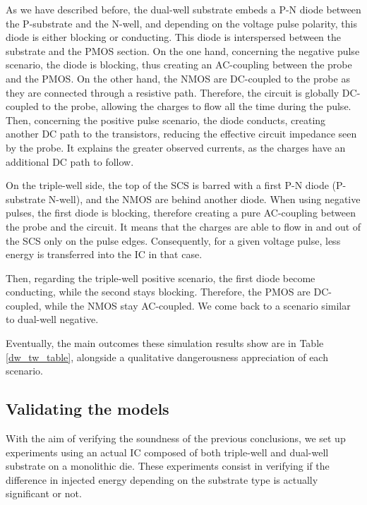 		As we have described before, the dual-well substrate embeds a P-N diode between the P-substrate and the N-well, and depending on the voltage pulse polarity, this diode is either blocking or conducting.
		This diode is interspersed between the substrate and the PMOS section.
		On the one hand, concerning the negative pulse scenario, the diode is blocking, thus creating an AC-coupling between the probe and the PMOS.
		On the other hand, the NMOS are DC-coupled to the probe as they are connected through a resistive path.
		Therefore, the circuit is globally DC-coupled to the probe, allowing the charges to flow all the time during the pulse.
		Then, concerning the positive pulse scenario, the diode conducts, creating another DC path to the transistors, reducing the effective circuit impedance seen by the probe.
		It explains the greater observed currents, as the charges have an additional DC path to follow.

		On the triple-well side, the top of the SCS is barred with a first P-N diode (P-substrate N-well), and the NMOS are behind another diode.
		When using negative pulses, the first diode is blocking, therefore creating a pure AC-coupling between the probe and the circuit.
		It means that the charges are able to flow in and out of the SCS only on the pulse edges.
		Consequently, for a given voltage pulse, less energy is transferred into the IC in that case.

		Then, regarding the triple-well positive scenario, the first diode become conducting, while the second stays blocking.
		Therefore, the PMOS are DC-coupled, while the NMOS stay AC-coupled.
		We come back to a scenario similar to dual-well negative.

		
		Eventually, the main outcomes these simulation results show are in Table \ref{dw_tw_table}, alongside a qualitative dangerousness appreciation of each scenario.

\subsection{Validating the models}
	With the aim of verifying the soundness of the previous conclusions, we set up experiments using an actual IC composed of both triple-well and dual-well substrate on a monolithic die.
	These experiments consist in verifying if the difference in injected energy depending on the substrate type is actually significant or not.
	

